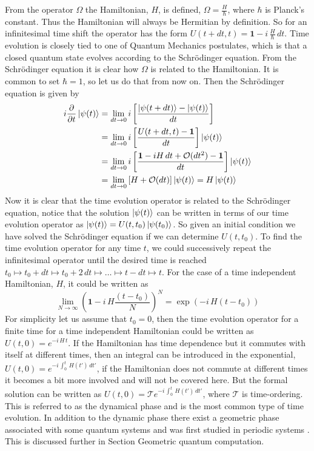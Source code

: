 From the operator $\Omega$ the Hamiltonian, $H$, is defined, $\Omega = \frac{H}{\hbar}$, where $\hbar$ is Planck's constant. Thus the Hamiltonian will always be Hermitian by definition. So for an infinitesimal time shift the operator has the form $U(t + dt, t) = \mathbf{1} - i\,\frac{H}{\hbar} \,dt$.
Time evolution is closely tied to one of Quantum Mechanics postulates, which is that a closed quantum state evolves according to the Schrödinger equation. From the Schrödinger equation it is clear how $\Omega$ is related to the Hamiltonian. It is common to set $\hbar = 1$, so let us do that from now on. Then the Schrödinger equation is given by 
\begin{equation} 
\begin{aligned}
i \pdv{}{t} \ket{\psi(t)} &= \lim_{dt \rightarrow 0} i\left[ \frac{\ket{\psi(t+dt)} - \ket{\psi(t)}}{dt} \right] \\&= \lim_{dt \rightarrow 0} i\left[ \frac{U(t+dt,t) - \mathbf{1}}{dt} \right]\ket{\psi(t)} \\&= \lim_{dt \rightarrow 0} i\left[ \frac{\mathbf{1} - iH\,dt + \mathcal{O}(dt^2) - \mathbf{1}}{dt} \right]\ket{\psi(t)} \\&= \lim_{dt \rightarrow 0} \left[H + \mathcal{O}(dt) \right]\ket{\psi(t)}  = H\ket{\psi(t)}
\end{aligned}
\label{eq:schro}
\end{equation} 
Now it is clear that the time evolution operator is related to the Schrödinger equation, notice that the solution $\ket{\psi(t)}$ can be written in terms of our time evolution operator as
$\ket{\psi(t)} = U(t,t_0)\ket{\psi(t_0)}$. So given an initial condition we have solved the Schrödinger equation if we can determine $U(t,t_0)$.  
To find the time evolution operator for any time $t$, we could successively repeat the infinitesimal operator until the desired time is reached $t_0 \mapsto t_0 + dt \mapsto t_0 + 2\,dt \mapsto \dots \mapsto t - dt \mapsto t$. For the case of a time independent Hamiltonian, $H$, it could be written as
\begin{equation}
\lim_{N \rightarrow \infty} \left(\mathbf{1} - i\,H\frac{(t-t_0)}{N} \right)^N = \exp\left(- i\,H(t-t_0) \right)
\end{equation}
For simplicity let us assume that $t_0 = 0$, then the time evolution operator for a finite time for a time independent Hamiltonian could be written as $U(t,0) = e^{-i\,H\,t}$. If the Hamiltonian has time dependence but it commutes with itself at different times, then an integral can be introduced in the exponential, $U(t,0) = e^{-i\,\int_0^t \,H(t')\, dt'}$, if the Hamiltonian does not commute at different times it becomes a bit more involved and will not be covered here. But the formal solution can be written as $U(t,0) = \mathcal{T}e^{-i\,\int_0^t \,H(t')\, dt'}$, where $\mathcal{T}$ is time-ordering. This is referred to as the dynamical phase and is the most common type of time evolution. In addition to the dynamic phase there exist a geometric phase associated with some quantum systems and was first studied in periodic systems \cite{berry}. This is discussed further in Section Geometric quantum computation.

